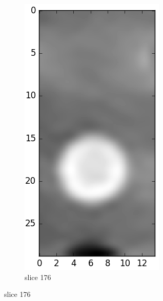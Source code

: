 \begin{figure}[!tbh]
\begin{subfigure}[b]{0.32\textwidth}
	\end{subfigure}
	\begin{subfigure}[b]{0.32\textwidth}
	  \includegraphics[width=\linewidth]{../fig/python/ph2/brightness/ph2_CT_pane@176}
	  \caption{slice 176}
	  \label{fig:ph2_CT_x100_pane_1}

\end{subfigure}
\end{figure}
